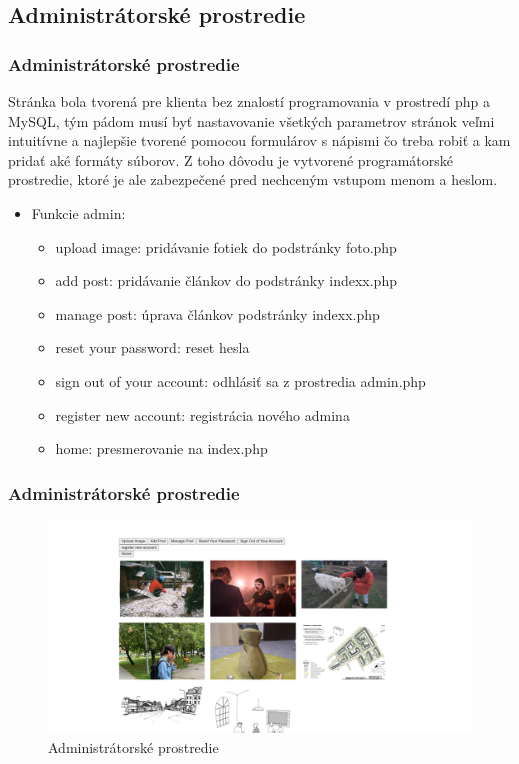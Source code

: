 \subsection{Administrátorské prostredie}

\begin{frame}\frametitle{Administrátorské prostredie}
Stránka bola tvorená pre klienta bez znalostí programovania v prostredí php
a MySQL, tým pádom musí byť nastavovanie všetkých parametrov stránok veľmi intuitívne a najlepšie tvorené pomocou formulárov s nápismi čo treba robiť a kam pridať aké
formáty súborov. Z toho dôvodu je vytvorené programátorské prostredie, ktoré je ale zabezpečené pred nechceným vstupom menom a heslom.

 \begin{itemize}
 \item Funkcie admin:
           \begin{itemize}
          \item upload image: pridávanie fotiek do podstránky foto.php
          \item add post: pridávanie článkov do podstránky indexx.php
          \item manage post: úprava článkov podstránky indexx.php
          \item reset your password: reset hesla
          \item sign out of your account: odhlásiť sa z prostredia admin.php
          \item register new account: registrácia nového admina
          \item home: presmerovanie na index.php
         \end{itemize}
 \end{itemize}


\end{frame}

\begin{frame}\frametitle{Administrátorské prostredie}
  \begin{figure}[htb]
    \centering
    \includegraphics[scale=0.30]{admin.png}
    \caption{Administrátorské prostredie}
  \end{figure}
\end{frame}
